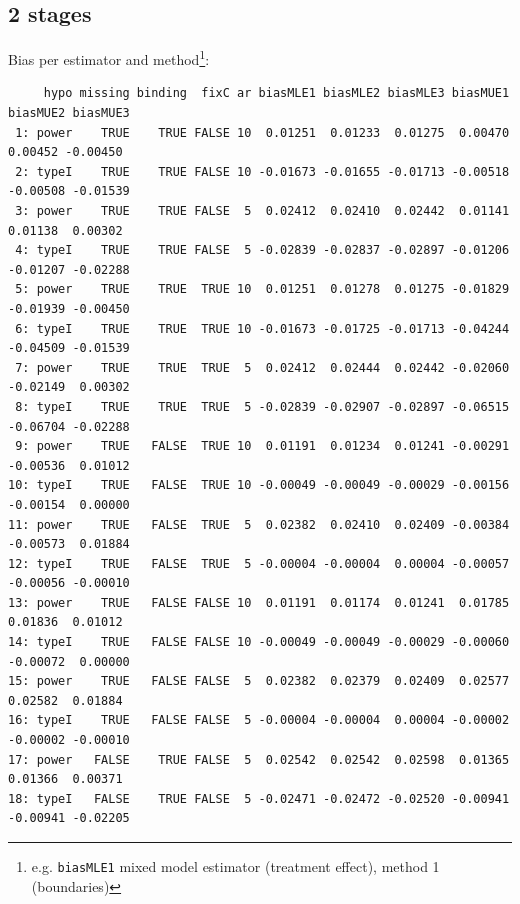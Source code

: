 \documentclass[12pt]{article}
\begin{document}
\subsection{2 stages}
\label{sec:org3dabc8f}
Bias per estimator and method\footnote{e.g. \texttt{biasMLE1} mixed model
estimator (treatment effect), method 1 (boundaries)}:
\begin{adjustwidth}{-1cm}{-1cm}
\begin{verbatim}
     hypo missing binding  fixC ar biasMLE1 biasMLE2 biasMLE3 biasMUE1 biasMUE2 biasMUE3
 1: power    TRUE    TRUE FALSE 10  0.01251  0.01233  0.01275  0.00470  0.00452 -0.00450
 2: typeI    TRUE    TRUE FALSE 10 -0.01673 -0.01655 -0.01713 -0.00518 -0.00508 -0.01539
 3: power    TRUE    TRUE FALSE  5  0.02412  0.02410  0.02442  0.01141  0.01138  0.00302
 4: typeI    TRUE    TRUE FALSE  5 -0.02839 -0.02837 -0.02897 -0.01206 -0.01207 -0.02288
 5: power    TRUE    TRUE  TRUE 10  0.01251  0.01278  0.01275 -0.01829 -0.01939 -0.00450
 6: typeI    TRUE    TRUE  TRUE 10 -0.01673 -0.01725 -0.01713 -0.04244 -0.04509 -0.01539
 7: power    TRUE    TRUE  TRUE  5  0.02412  0.02444  0.02442 -0.02060 -0.02149  0.00302
 8: typeI    TRUE    TRUE  TRUE  5 -0.02839 -0.02907 -0.02897 -0.06515 -0.06704 -0.02288
 9: power    TRUE   FALSE  TRUE 10  0.01191  0.01234  0.01241 -0.00291 -0.00536  0.01012
10: typeI    TRUE   FALSE  TRUE 10 -0.00049 -0.00049 -0.00029 -0.00156 -0.00154  0.00000
11: power    TRUE   FALSE  TRUE  5  0.02382  0.02410  0.02409 -0.00384 -0.00573  0.01884
12: typeI    TRUE   FALSE  TRUE  5 -0.00004 -0.00004  0.00004 -0.00057 -0.00056 -0.00010
13: power    TRUE   FALSE FALSE 10  0.01191  0.01174  0.01241  0.01785  0.01836  0.01012
14: typeI    TRUE   FALSE FALSE 10 -0.00049 -0.00049 -0.00029 -0.00060 -0.00072  0.00000
15: power    TRUE   FALSE FALSE  5  0.02382  0.02379  0.02409  0.02577  0.02582  0.01884
16: typeI    TRUE   FALSE FALSE  5 -0.00004 -0.00004  0.00004 -0.00002 -0.00002 -0.00010
17: power   FALSE    TRUE FALSE  5  0.02542  0.02542  0.02598  0.01365  0.01366  0.00371
18: typeI   FALSE    TRUE FALSE  5 -0.02471 -0.02472 -0.02520 -0.00941 -0.00941 -0.02205
\end{verbatim}
\end{adjustwidth}
\end{document}
